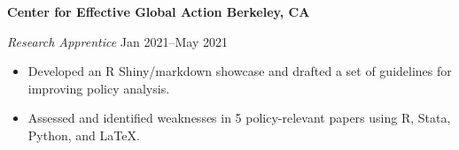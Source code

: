 \textbf{Center for Effective Global Action \hfill Berkeley, CA}\par

\textit{Research Apprentice} \hfill Jan 2021--May 2021
\begin{itemize}
	\item Developed an R Shiny/markdown showcase and drafted a set of guidelines for improving policy analysis.
	\item Assessed and identified weaknesses in 5 policy-relevant papers using R, Stata, Python, and \LaTeX.
\end{itemize}\par